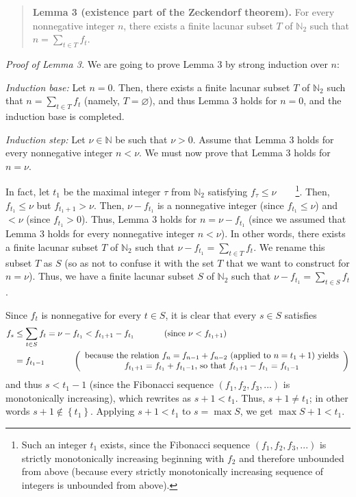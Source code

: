 \documentclass[12pt,final,notitlepage,onecolumn]{article}%
\begin{document}
\begin{quote}
\textbf{Lemma 3 (existence part of the Zeckendorf theorem).} For every
nonnegative integer $n$, there exists a finite lacunar subset $T$ of
$\mathbb{N}_{2}$ such that $n=\sum\limits_{t\in T}f_{t}$.
\end{quote}

\textit{Proof of Lemma 3.} We are going to prove Lemma 3 by strong induction
over $n$:

\textit{Induction base:} Let $n=0$. Then, there exists a finite lacunar subset
$T$ of $\mathbb{N}_{2}$ such that $n=\sum\limits_{t\in T}f_{t}$ (namely,
$T=\varnothing$), and thus Lemma 3 holds for $n=0$, and the induction base is completed.

\textit{Induction step:} Let $\nu\in\mathbb{N}$ be such that $\nu>0$. Assume
that Lemma 3 holds for every nonnegative integer $n<\nu$. We must now prove
that Lemma 3 holds for $n=\nu$.

In fact, let $t_{1}$ be the maximal integer $\tau$ from $\mathbb{N}_{2}$
satisfying $f_{\tau}\leq\nu$\ \ \ \ \footnote{Such an integer $t_{1}$ exists,
since the Fibonacci sequence $\left(  f_{1},f_{2},f_{3},...\right)  $ is
strictly monotonically increasing beginning with $f_{2}$ and therefore
unbounded from above (because every strictly monotonically increasing sequence
of integers is unbounded from above).}. Then, $f_{t_{1}}\leq\nu$ but
$f_{t_{1}+1}>\nu$. Then, $\nu-f_{t_{1}}$ is a nonnegative integer (since
$f_{t_{1}}\leq\nu$) and $<\nu$ (since $f_{t_{1}}>0$). Thus, Lemma 3 holds for
$n=\nu-f_{t_{1}}$ (since we assumed that Lemma 3 holds for every nonnegative
integer $n<\nu$). In other words, there exists a finite lacunar subset $T$ of
$\mathbb{N}_{2}$ such that $\nu-f_{t_{1}}=\sum\limits_{t\in T}f_{t}$. We
rename this subset $T$ as $S$ (so as not to confuse it with the set $T$ that
we want to construct for $n=\nu$). Thus, we have a finite lacunar subset $S$ of
$\mathbb{N}_{2}$ such that $\nu-f_{t_{1}}=\sum\limits_{t\in S}f_{t}$.

Since $f_{t}$ is nonnegative for every $t\in S$, it is clear that every $s\in
S$ satisfies%
\begin{align*}
f_{s}  &  \leq\sum\limits_{t\in S}f_{t}=\nu-f_{t_{1}}<f_{t_{1}+1}-f_{t_{1}%
}\ \ \ \ \ \ \ \ \ \ \left(  \text{since }\nu<f_{t_{1}+1}\right) \\
&  =f_{t_{1}-1}\ \ \ \ \ \ \ \ \ \ \left(
\begin{array}
[c]{c}%
\text{because the relation }f_{n}=f_{n-1}+f_{n-2}\text{ (applied to }%
n=t_{1}+1\text{) yields}\\
f_{t_{1}+1}=f_{t_{1}}+f_{t_{1}-1}\text{, so that }f_{t_{1}+1}-f_{t_{1}%
}=f_{t_{1}-1}%
\end{array}
\right)
\end{align*}
and thus $s<t_{1}-1$ (since the Fibonacci sequence $\left(  f_{1},f_{2}%
,f_{3},...\right)  $ is monotonically increasing), which rewrites as
$s+1<t_{1}$. Thus, $s+1\neq t_{1}$; in other words $s+1\notin\left\{
t_{1}\right\}  $. Applying $s+1<t_{1}$ to $s=\max S$, we get $\max S+1<t_{1}$.
\end{document}

